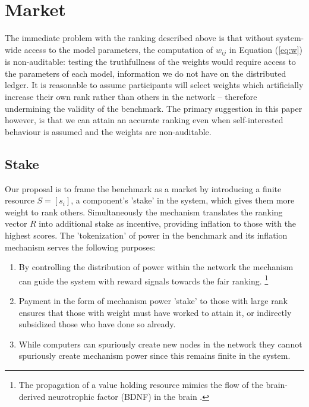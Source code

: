 \documentclass{article}
\begin{document}
\section{Market}
\label{sec:market}

The immediate problem with the ranking described above is that without system-wide access to the model parameters, the computation of $w_{ij}$ in Equation (\ref{eq:w}) is non-auditable: testing the truthfullness of the weights would require access to the parameters of each model, information we do not have on the distributed ledger. It is reasonable to assume participants will select weights which artificially increase their own rank rather than others in the network -- therefore undermining the validity of the benchmark. The primary suggestion in this paper however, is that we can attain an accurate ranking even when self-interested behaviour is assumed and the weights are non-auditable.  

\subsection{Stake}
\label{sec:stake}
Our proposal is to frame the benchmark as a market by introducing a finite resource $ S=[s_i]$, a component's 'stake' in the system, which gives them more weight to rank others. Simultaneously the mechanism translates the ranking vector $R$ into additional stake as incentive, providing inflation to those with the highest scores. The 'tokenization' of power in the benchmark and its inflation mechanism serves the following purposes: 

\begin{enumerate}
    \item By controlling the distribution of power within the network the mechanism can guide the system with reward signals towards the fair ranking. \footnote{The propagation of a value holding resource mimics the flow of the brain-derived neurotrophic factor (BDNF) in the brain \cite{Bathina1989neurotrophin}.} 
	\item Payment in the form of mechanism power 'stake' to those with large rank ensures that those with weight must have worked to attain it, or indirectly subsidized those who have done so already. 
    \item While computers can spuriously create new nodes in the network they cannot spuriously create mechanism power since this remains finite in the system.
\end{enumerate}
\end{document}
